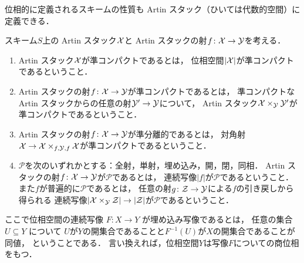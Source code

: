     位相的に定義されるスキームの性質も Artin スタック（ひいては代数的空間）に定義できる．
    \begin{Def}
        スキーム$S$上の Artin スタック$\mathcal{X}$と
        Artin スタックの射$f \colon \mathcal{X} \to \mathcal{Y}$を考える．
    \begin{enumerate}
    \item
        Artin スタック$\mathcal{X}$が準コンパクトであるとは，
        位相空間$|\mathcal{X}|$が準コンパクトであるということ．

    \item
        Artin スタックの射$f \colon \mathcal{X} \to \mathcal{Y}$が準コンパクトであるとは，
        準コンパクトな Artin スタックからの任意の射$\mathcal{Y}' \to \mathcal{Y}$について，
        Artin スタック$\mathcal{X} \times_{\mathcal{Y}} \mathcal{Y}'$が準コンパクトであるということ．

    \item
        Artin スタックの射$f \colon \mathcal{X} \to \mathcal{Y}$が準分離的であるとは，
        対角射$\mathcal{X} \to \mathcal{X} \times_{f,\mathcal{Y},f} \mathcal{X}$が準コンパクトであるということ．
    \item
        $\mathcal{P}$を次のいずれかとする：全射，単射，埋め込み，開，閉，同相．
        Artin スタックの射$f \colon \mathcal{X} \to \mathcal{Y}$が$\mathcal{P}$であるとは，
        連続写像$|f|$が$\mathcal{P}$であるということ．
        また$f$が普遍的に$\mathcal{P}$であるとは，
        任意の射$g \colon \mathcal{Z} \to \mathcal{Y}$による$f$の引き戻しから得られる
        連続写像$|\mathcal{X} \times_{\mathcal{Y}} \mathcal{Z}| \to |\mathcal{Z}|$が$\mathcal{P}$であるということ．
    \end{enumerate}
    \end{Def}

    ここで位相空間の連続写像 $F \colon X \to Y$ が埋め込み写像であるとは，
    任意の集合 $U \subseteq Y$ について
    $U$が$Y$の開集合であることと$F^{-1}(U)$が$X$の開集合であることが同値，
    ということである．
    言い換えれば，位相空間$Y$は写像$F$についての商位相をもつ．

